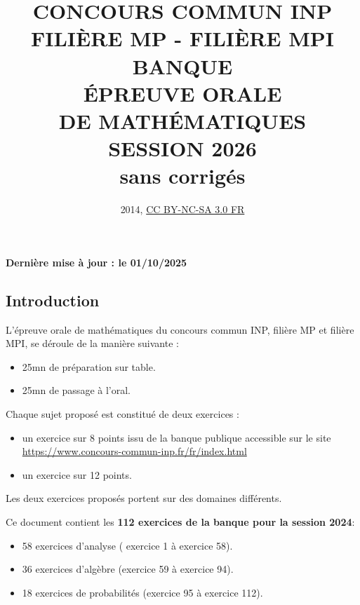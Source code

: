 \documentclass[10pt,oneside]{article}
\author{
}
\date{2014,  \href{http://creativecommons.org/licenses/by-nc-sa/3.0/deed.fr}{CC BY-NC-SA 3.0 FR}}
\title{\vspace{\fill}\textbf{ CONCOURS COMMUN INP \\ FILIÈRE  MP - FILIÈRE MPI \\\vspace{3cm}
\Huge{\textbf{BANQUE\\ \'EPREUVE ORALE\\DE MATH\'EMATIQUES\\SESSION 2026\\\vspace{3cm} sans corrigés }}}  \vspace{\fill}}
\def\datedemiseajour{01/10/2025}
\begin{document}
\maketitle

\thispagestyle{empty}
\begin{flushright}
\textbf{Dernière mise à jour : le \datedemiseajour }
\end{flushright}




\pagebreak
\begin{flushleft}


\section*{Introduction}
L’épreuve orale de mathématiques du concours commun INP,  filière MP et filière MPI, se déroule de
la manière suivante :
\begin{itemize}
\item
25mn de préparation sur table.
\item 
25mn de passage à l’oral.
\end{itemize}
\bigskip

Chaque sujet proposé  est  constitué de deux exercices :
\begin{itemize}
\item
un exercice sur 8 points issu de la banque publique accessible sur le
site \url{https://www.concours-commun-inp.fr/fr/index.html}\\
\item
un exercice sur 12 points.
\end{itemize}

\medskip
Les deux exercices proposés portent sur des domaines différents.\\
\bigskip

Ce document contient les \textbf{112 exercices de la banque pour la
  session 2024}:
\begin{itemize}
\item
58 exercices d'analyse ( exercice 1 à exercice 58).\\
\item
36 exercices d'algèbre (exercice 59 à exercice 94). \\
\item
18 exercices de probabilités (exercice 95 à exercice 112).
\end{itemize}


\end{flushleft}
\end{document}
